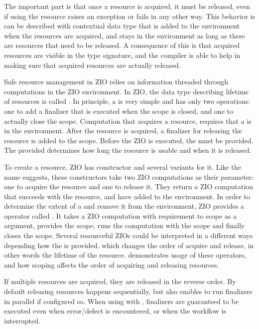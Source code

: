 The important part is that once a resource is acquired, it must be released, even if using the resource raises an exception or fails in any other way. This behavior is can be described with contextual data type that is added to the environment when the resources are acquired, and stays in the environment as long as there are resources that need to be released. A consequence of this is that acquired resources are visible in the type signature, and the compiler is able to help in making sure that acquired resources are actually released.

Safe resource management in ZIO relies on information threaded through computations in the ZIO environment. In ZIO, the data type describing lifetime of resources is called . In principle, a  is very simple and has only two operations: one to add a finalizer that is executed when the scope is closed, and one to actually close the scope. Computation that acquires a resource, requires that a  is in the environment. After the resource is acquired, a finalizer for releasing the resource is added to the scope. Before the ZIO is executed, the  must be provided. The provided  determines how long the resource is usable and when it is released. 

To create a resource, ZIO has  constructor and several variants for it. Like the name suggests, these constructors take two ZIO computations as their parameter: one to acquire the resource and one to release it. They return a ZIO computation that succeeds with the resource, and have added  to the environment. In order to determine the extent of a  and remove it from the environment, ZIO provides a operator called . It takes a ZIO computation with requirement to scope as a argument, provides the scope, runs the computation with the scope and finally closes the scope. Several resourceful ZIOs could be interpreted in a different ways depending how the  is provided, which changes the order of acquire and release, in other words the lifetime of the resource.  demonstrates usage of these operators, and how scoping affects the order of acquiring and releasing resources.



If multiple resources are acquired, they are released in the reverse order. By default releasing resources happens sequentially, but  also enables to run finalizers in parallel if configured so. 
When using  with , finalizers are guaranteed to be executed even when error/defect is encountered, or when the workflow is interrupted.

